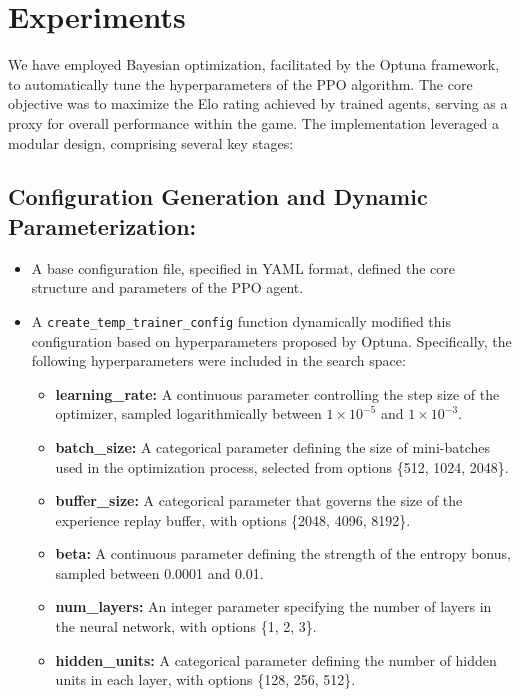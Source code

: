 \documentclass{LSkill}
\begin{document}
\section{Experiments}
\label{sec:experiments}
We have employed Bayesian optimization, facilitated by the Optuna framework, to automatically tune the hyperparameters of the PPO algorithm. The core objective was to maximize the Elo rating achieved by trained agents, serving as a proxy for overall performance within the game. The implementation leveraged a modular design, comprising several key stages:
\subsection{Configuration Generation and Dynamic Parameterization:}
\begin{itemize}
    \item A base configuration file, specified in YAML format, defined the core structure and parameters of the PPO agent.
    \item A \texttt{create\_temp\_trainer\_config} function dynamically modified this configuration based on hyperparameters proposed by Optuna. Specifically, the following hyperparameters were included in the search space:
    \begin{itemize}
        \item \textbf{learning\_rate:} A continuous parameter controlling the step size of the optimizer, sampled logarithmically between \(1 \times 10^{-5}\) and \(1 \times 10^{-3}\).
        \item \textbf{batch\_size:} A categorical parameter defining the size of mini-batches used in the optimization process, selected from options \{512, 1024, 2048\}.
        \item \textbf{buffer\_size:} A categorical parameter that governs the size of the experience replay buffer, with options \{2048, 4096, 8192\}.
        \item \textbf{beta:} A continuous parameter defining the strength of the entropy bonus, sampled between 0.0001 and 0.01.
        \item \textbf{num\_layers:} An integer parameter specifying the number of layers in the neural network, with options \{1, 2, 3\}.
        \item \textbf{hidden\_units:} A categorical parameter defining the number of hidden units in each layer, with options \{128, 256, 512\}.
    \end{itemize}
\end{itemize}
\end{document}
